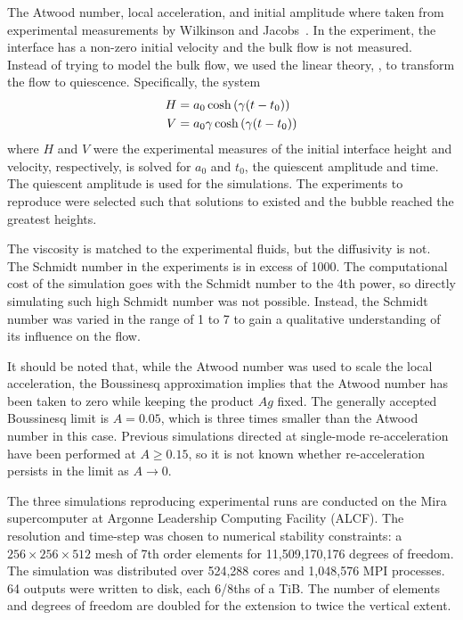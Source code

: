 The Atwood number, local acceleration, and initial amplitude where taken from experimental measurements by Wilkinson and Jacobs~\cite{Wilkinson2007, JacobsPrivate}.
In the experiment, the interface has a non-zero initial velocity and the bulk flow is not measured.
Instead of trying to model the bulk flow, we used the linear theory, , to transform the flow to quiescence.
Specifically, the system
\begin{align} \elabel{rollback}
H &= a_0 \cosh\left(\gamma (t - t_0)\right) \\
V &= a_0 \gamma \cosh\left(\gamma (t-t_0) \right)  \nonumber
\end{align}
where $H$ and $V$ were the experimental measures of the initial interface height and velocity, respectively,
is solved for $a_0$ and $t_0$, the quiescent amplitude and time.
The quiescent amplitude is used for the simulations.
The experiments to reproduce were selected such that solutions to  existed and the bubble reached the greatest heights.

The viscosity is matched to the experimental fluids, but the diffusivity is not.
The Schmidt number in the experiments is in excess of 1000.
The computational cost of the simulation goes with the Schmidt number to the 4th power, so directly simulating such high Schmidt number was not possible.
Instead, the Schmidt number was varied in the range of 1 to 7 to gain a qualitative understanding of its influence on the flow.

It should be noted that, while the Atwood number was used to scale the local acceleration, the Boussinesq approximation implies that the Atwood number has been taken to zero while keeping the product $Ag$ fixed.
The generally accepted Boussinesq limit is $A = 0.05$, which is three times smaller than the Atwood number in this case.
Previous simulations directed at single-mode re-acceleration have been performed at $A \ge 0.15$, so it is not known whether re-acceleration persists in the limit as $A \rightarrow 0$.

The three simulations reproducing experimental runs are conducted on the Mira supercomputer at Argonne Leadership Computing Facility (ALCF).
The resolution and time-step was chosen to numerical stability constraints: a $256\times256\times512$ mesh of 7th order elements for 11,509,170,176 degrees of freedom.
The simulation was distributed over 524,288 cores and 1,048,576 MPI processes.
64 outputs were written to disk, each 6/8ths of a TiB.
The number of elements and degrees of freedom are doubled for the extension to twice the vertical extent.

